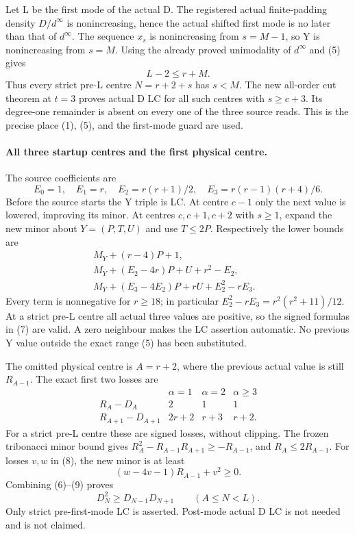 Let L be the first mode of the actual D. The registered actual
finite-padding density $D/d^\infty$ is nonincreasing, hence
the actual shifted first mode is no later than that of $d^\infty$.
The sequence $x_s$ is nonincreasing from $s=M-1$, so Y is
nonincreasing from $s=M$. Using the already proved unimodality of
$d^\infty$ and (5) gives
\[
                         L-2\le r+M.                \tag{6}
\]
Thus every strict pre-L centre $N=r+2+s$ has $s<M$.
The new all-order cut theorem at $t=3$ proves actual D LC for
all such centres with $s\ge c+3$. Its degree-one remainder
is absent on every one of the three source reads. This is the
precise place (1), (5), and the first-mode guard are used.

\paragraph{All three startup centres and the first physical centre.}
The source coefficients are
\[
 E_0=1,\quad E_1=r,\quad E_2=r(r+1)/2,
 \quad E_3=r(r-1)(r+4)/6.
\]
Before the source starts the Y triple is LC. At centre $c-1$
only the next value is lowered, improving its minor. At centres
$c,c+1,c+2$ with $s\ge1$, expand the new minor about
$Y=(P,T,U)$ and use $T\le2P$. Respectively the lower bounds are
\[
\begin{split}
 M_Y+(r-4)P+1,&\\
 M_Y+(E_2-4r)P+U+r^2-E_2,&\\
 M_Y+(E_3-4E_2)P+rU+E_2^2-rE_3.&
\end{split}                                                   \tag{7}
\]
Every term is nonnegative for $r\ge18$; in particular
$E_2^2-rE_3=r^2(r^2+11)/12$. At a strict pre-L centre all actual
three values are positive, so the signed formulas in (7) are valid.
A zero neighbour makes the LC assertion automatic. No previous
Y value outside the exact range (5) has been substituted.

The omitted physical centre is $A=r+2$, where the previous
actual value is still $R_{A-1}$. The exact first two losses are
\[
 \begin{array}{c|ccc}
 &\alpha=1&\alpha=2&\alpha\ge3\\ \hline
 R_A-D_A&2&1&1\\
 R_{A+1}-D_{A+1}&2r+2&r+3&r+2 .
 \end{array}                                                   \tag{8}
\]
For a strict pre-L centre these are signed losses, without clipping.
The frozen tribonacci minor bound gives
$R_A^2-R_{A-1}R_{A+1}\ge-R_{A-1}$, and
$R_A\le2R_{A-1}$. For losses $v,w$ in (8), the new minor is
at least
\[
                    (w-4v-1)R_{A-1}+v^2\ge0.       \tag{9}
\]
Combining (6)--(9) proves
\[
       D_N^2\ge D_{N-1}D_{N+1}\qquad(A\le N<L).     \tag{10}
\]
Only strict pre-first-mode LC is asserted. Post-mode actual D LC
is not needed and is not claimed.

